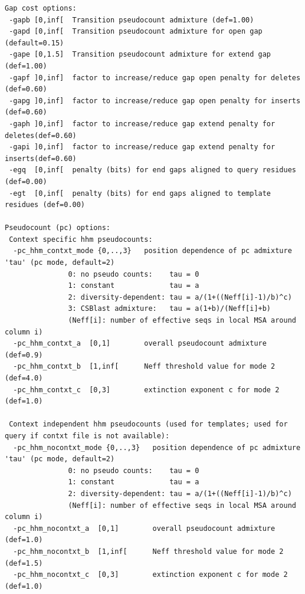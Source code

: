 \documentclass[11pt,a4paper]{article}
\begin{document}
\begin{verbatim}
Gap cost options:                                                                
 -gapb [0,inf[  Transition pseudocount admixture (def=1.00)                     
 -gapd [0,inf[  Transition pseudocount admixture for open gap (default=0.15)    
 -gape [0,1.5]  Transition pseudocount admixture for extend gap (def=1.00)      
 -gapf ]0,inf]  factor to increase/reduce gap open penalty for deletes (def=0.60) 
 -gapg ]0,inf]  factor to increase/reduce gap open penalty for inserts (def=0.60) 
 -gaph ]0,inf]  factor to increase/reduce gap extend penalty for deletes(def=0.60)
 -gapi ]0,inf]  factor to increase/reduce gap extend penalty for inserts(def=0.60)
 -egq  [0,inf[  penalty (bits) for end gaps aligned to query residues (def=0.00) 
 -egt  [0,inf[  penalty (bits) for end gaps aligned to template residues (def=0.00)

Pseudocount (pc) options:                                                        
 Context specific hhm pseudocounts:
  -pc_hhm_contxt_mode {0,..,3}   position dependence of pc admixture 'tau' (pc mode, default=2) 
               0: no pseudo counts:    tau = 0                                  
               1: constant             tau = a                                  
               2: diversity-dependent: tau = a/(1+((Neff[i]-1)/b)^c)            
               3: CSBlast admixture:   tau = a(1+b)/(Neff[i]+b)                 
               (Neff[i]: number of effective seqs in local MSA around column i) 
  -pc_hhm_contxt_a  [0,1]        overall pseudocount admixture (def=0.9)                        
  -pc_hhm_contxt_b  [1,inf[      Neff threshold value for mode 2 (def=4.0)                      
  -pc_hhm_contxt_c  [0,3]        extinction exponent c for mode 2 (def=1.0)                     

 Context independent hhm pseudocounts (used for templates; used for query if contxt file is not available):
  -pc_hhm_nocontxt_mode {0,..,3}   position dependence of pc admixture 'tau' (pc mode, default=2) 
               0: no pseudo counts:    tau = 0                                  
               1: constant             tau = a                                  
               2: diversity-dependent: tau = a/(1+((Neff[i]-1)/b)^c)            
               (Neff[i]: number of effective seqs in local MSA around column i) 
  -pc_hhm_nocontxt_a  [0,1]        overall pseudocount admixture (def=1.0)                        
  -pc_hhm_nocontxt_b  [1,inf[      Neff threshold value for mode 2 (def=1.5)                      
  -pc_hhm_nocontxt_c  [0,3]        extinction exponent c for mode 2 (def=1.0)                     


\end{verbatim}
\end{document}

